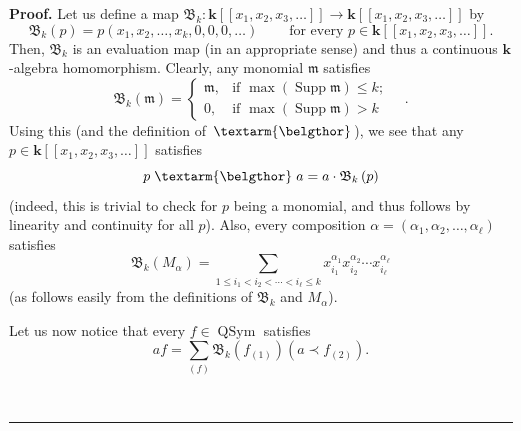 \documentclass[numbers=enddot,12pt,final,onecolumn,notitlepage,abstracton]{scrartcl}%
\theoremstyle{definition}
\newenvironment{proof}[1][Proof]{\noindent\textbf{#1.} }{\ \rule{0.5em}{0.5em}}
\newenvironment{vershort}{}{}
\newcommand{\bel}{\left. \textarm{\belgthor} \right.}
\let\sumnonlimits\sum
\renewcommand{\sum}{\sumnonlimits\limits}
\begin{document}
\begin{proof}
\begin{vershort}
Let us define a map $\mathfrak{B}_{k}:\mathbf{k}\left[  \left[  x_{1}%
,x_{2},x_{3},\ldots\right]  \right]  \rightarrow\mathbf{k}\left[  \left[
x_{1},x_{2},x_{3},\ldots\right]  \right]  $ by%
\[
\mathfrak{B}_{k}\left(  p\right)  =p\left(  x_{1},x_{2},\ldots,x_{k}%
,0,0,0,\ldots\right)  \ \ \ \ \ \ \ \ \ \ \text{for every }p\in\mathbf{k}%
\left[  \left[  x_{1},x_{2},x_{3},\ldots\right]  \right]  .
\]
Then, $\mathfrak{B}_{k}$ is an evaluation map (in an appropriate sense) and
thus a continuous $\mathbf{k}$-algebra homomorphism. Clearly, any monomial
$\mathfrak{m}$ satisfies%
\begin{equation}
\mathfrak{B}_{k}\left(  \mathfrak{m}\right)  =%
\begin{cases}
\mathfrak{m}, & \text{if }\max\left(  \operatorname*{Supp}\mathfrak{m}\right)
\leq k;\\
0, & \text{if }\max\left(  \operatorname*{Supp}\mathfrak{m}\right)  >k
\end{cases}
\quad. \label{pf.thm.beldend.short.monom}%
\end{equation}
Using this (and the definition of $\bel$), we see that any $p\in
\mathbf{k}\left[  \left[  x_{1},x_{2},x_{3},\ldots\right]  \right]  $
satisfies%
\begin{equation}
p\bel a=a\cdot\mathfrak{B}_{k}\left(  p\right)  \label{pf.thm.beldend.short.B}%
\end{equation}
(indeed, this is trivial to check for $p$ being a monomial, and thus follows
by linearity and continuity for all $p$). Also, every composition
$\alpha=\left(  \alpha_{1},\alpha_{2},\ldots,\alpha_{\ell}\right)  $ satisfies%
\begin{equation}
\mathfrak{B}_{k}\left(  M_{\alpha}\right)  =\sum_{1\leq i_{1}<i_{2}%
<\cdots<i_{\ell}\leq k}x_{i_{1}}^{\alpha_{1}}x_{i_{2}}^{\alpha_{2}}\cdots
x_{i_{\ell}}^{\alpha_{\ell}} \label{pf.thm.beldend.short.Malpha-bel-a}%
\end{equation}
(as follows easily from the definitions of $\mathfrak{B}_{k}$ and $M_{\alpha}$).

Let us now notice that every $f\in\operatorname*{QSym}$ satisfies%
\begin{equation}
af=\sum_{\left(  f\right)  }\mathfrak{B}_{k}\left(  f_{\left(  1\right)
}\right)  \left(  a\left.  \prec\right.  f_{\left(  2\right)  }\right)  .
\label{pf.thm.beldend.short.mainlem}%
\end{equation}



\end{vershort}
\end{proof}
\end{document}
